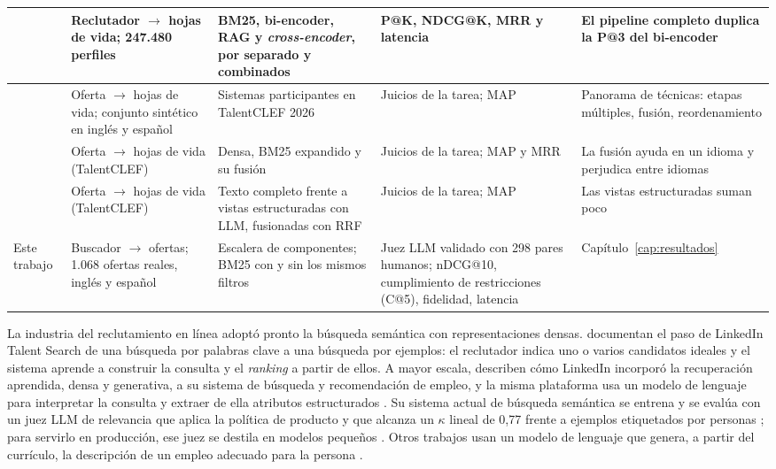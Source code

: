 {\begin{longtable}{|>{\raggedright\arraybackslash}p{2.2cm}|>{\raggedright\arraybackslash}p{2.6cm}|>{\raggedright\arraybackslash}p{3.1cm}|>{\raggedright\arraybackslash}p{2.8cm}|>{\raggedright\arraybackslash}p{2.6cm}|}
    \hline
    \citet{Julianto2026} & Reclutador $\rightarrow$ hojas de vida; 247.480 perfiles & BM25, bi-encoder, RAG y \textit{cross-encoder}, por separado y combinados & P@K, NDCG@K, MRR y latencia & El pipeline completo duplica la P@3 del bi-encoder \\
    \hline
    \citet{Fabregat2026} & Oferta $\rightarrow$ hojas de vida; conjunto sintético en inglés y español & Sistemas participantes en TalentCLEF 2026 & Juicios de la tarea; MAP & Panorama de técnicas: etapas múltiples, fusión, reordenamiento \\
    \hline
    \citet{Thuma2026} & Oferta $\rightarrow$ hojas de vida (TalentCLEF) & Densa, BM25 expandido y su fusión & Juicios de la tarea; MAP y MRR & La fusión ayuda en un idioma y perjudica entre idiomas \\
    \hline
    \citet{Tran2026QTPride} & Oferta $\rightarrow$ hojas de vida (TalentCLEF) & Texto completo frente a vistas estructuradas con LLM, fusionadas con RRF & Juicios de la tarea; MAP & Las vistas estructuradas suman poco \\
    \hline
    Este trabajo & Buscador $\rightarrow$ ofertas; 1.068 ofertas reales, inglés y español & Escalera de componentes; BM25 con y sin los mismos filtros & Juez LLM validado con 298 pares humanos; nDCG@10, cumplimiento de restricciones (C@5), fidelidad, latencia & Capítulo~\ref{cap:resultados} \\
    \hline
\end{longtable}
}

La industria del reclutamiento en línea adoptó pronto la búsqueda semántica con representaciones densas. \citet{HaThuc2017} documentan el paso de LinkedIn Talent Search de una búsqueda por palabras clave a una búsqueda por ejemplos: el reclutador indica uno o varios candidatos ideales y el sistema aprende a construir la consulta y el \textit{ranking} a partir de ellos. A mayor escala, \citet{Shen2024} describen cómo LinkedIn incorporó la recuperación aprendida, densa y generativa, a su sistema de búsqueda y recomendación de empleo, y la misma plataforma usa un modelo de lenguaje para interpretar la consulta y extraer de ella atributos estructurados \citep{Liu2025}. Su sistema actual de búsqueda semántica se entrena y se evalúa con un juez LLM de relevancia que aplica la política de producto y que alcanza un $\kappa$ lineal de 0,77 frente a ejemplos etiquetados por personas \citep{Borisyuk2026}; para servirlo en producción, ese juez se destila en modelos pequeños \citep{Behdin2025}. Otros trabajos usan un modelo de lenguaje que genera, a partir del currículo, la descripción de un empleo adecuado para la persona \citep{ZhengGIRL2023}.

